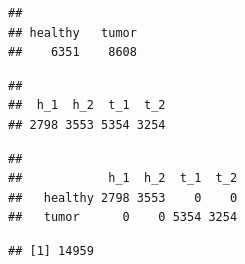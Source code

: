 \documentclass[
]{article}
\newenvironment{Shaded}{\begin{snugshade}}{\end{snugshade}}
\newcommand{\CommentTok}[1]{\textcolor[rgb]{0.56,0.35,0.01}{\textit{#1}}}
\newcommand{\FunctionTok}[1]{\textcolor[rgb]{0.00,0.00,0.00}{#1}}
\newcommand{\NormalTok}[1]{#1}
\newcommand{\SpecialCharTok}[1]{\textcolor[rgb]{0.00,0.00,0.00}{#1}}
\begin{document}
\begin{Shaded}
\end{Shaded}

\begin{verbatim}
## 
## healthy   tumor 
##    6351    8608
\end{verbatim}

\begin{Shaded}
\end{Shaded}

\begin{verbatim}
## 
##  h_1  h_2  t_1  t_2 
## 2798 3553 5354 3254
\end{verbatim}

\begin{Shaded}
\end{Shaded}

\begin{verbatim}
##          
##            h_1  h_2  t_1  t_2
##   healthy 2798 3553    0    0
##   tumor      0    0 5354 3254
\end{verbatim}

\begin{Shaded}
\end{Shaded}

\begin{verbatim}
## [1] 14959
\end{verbatim}
\end{document}

